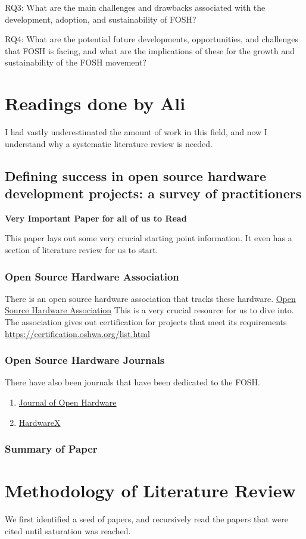 \documentclass{article}
\begin{document}
RQ3: What are the main challenges and drawbacks associated with the development, adoption, and sustainability of FOSH?

RQ4: What are the potential future developments, opportunities, and challenges that FOSH is facing, and what are the implications of these for the growth and sustainability of the FOSH movement?


\section{Readings done by Ali}

I had vastly underestimated the amount of work in this field, and now I understand why a systematic literature review is needed.

\subsection{Defining success in open source hardware development projects: a survey of practitioners}
\cite{p1_def_succ}

\textbf{Very Important Paper for all of us to Read}

This paper lays out some very crucial starting point information.
It even has a section of literature review for us to start.

\subsubsection{Open Source Hardware Association}
There is an open source hardware association that tracks these hardware.
\href{https://www.oshwa.org}{Open Source Hardware Association}
This is a very crucial resource for us to dive into. 
The association gives out certification for projects that meet its requirements
\href{https://certification.oshwa.org/list.html}{https://certification.oshwa.org/list.html}

\subsubsection{Open Source Hardware Journals}
There have also been journals that have been dedicated to the FOSH.
\begin{enumerate}
    \item \href{https://openhardware.metajnl.com/}{Journal of Open Hardware}
    \item \href{https://www.sciencedirect.com/journal/hardwarex}{HardwareX}
\end{enumerate}

\subsubsection{Summary of Paper}

\section{Methodology of Literature Review}
We first identified a seed of papers, and recursively read the papers that were cited until saturation was reached. 

\nocite{*}
\printbibliography
\end{document}
